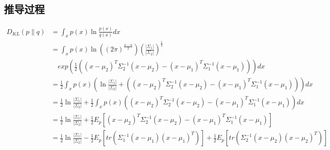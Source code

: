 \documentclass[UTF8,a4paper]{ctexart}
\begin{document}
  \subsection{推导过程}
\begin{small}
  \begin{align}
    D_{KL}\left( p\|q \right ) &= \int_x p(x)\ln \frac{ p(x) }{ q(x) } dx \label{eq1}\\
    &= \int_x p(x)
        \ln
          \left( (2\pi)^{\frac{n - n}{2}}   \right )
            \left( \frac{\left| \Sigma_1 \right|}{\left| \Sigma_2 \right|} \right )^\frac{1}{2}
            \\&\quad
            exp\left(
                \frac{1}{2}\left(
                  \left( x - \mu_2 \right)^T\Sigma_2^{-1}\left( x - \mu_2 \right) -
                  \left( x - \mu_1 \right)^T\Sigma_1^{-1}\left( x - \mu_1 \right)
                \right )
          \right )
        dx\label{eq2}\\
    &=  \frac{1}{2}
          \int_x p(x)
            \left(
              \ln \frac{\left| \Sigma_1 \right|}{\left| \Sigma_2 \right|} +
              \left(
                    \left( x - \mu_2 \right)^T\Sigma_2^{-1}\left( x - \mu_2 \right) -
                    \left( x - \mu_1 \right)^T\Sigma_1^{-1}\left( x - \mu_1 \right)
              \right )
            \right )
          dx\label{eq3}\\
    &=  \frac{1}{2} \ln \frac{\left| \Sigma_1 \right|}{\left| \Sigma_2 \right|} +
          \frac{1}{2}\int_x p(x)
                \left(
                \left( x - \mu_2 \right)^T\Sigma_2^{-1}\left( x - \mu_2 \right) -
                \left( x - \mu_1 \right)^T\Sigma_1^{-1}\left( x - \mu_1 \right)
                \right )
          dx\label{eq4}\\
    &=  \frac{1}{2} \ln \frac{\left| \Sigma_1 \right|}{\left| \Sigma_2 \right|} +
        \frac{1}{2} E_p
          \left[
            \left( x - \mu_2 \right)^T\Sigma_2^{-1}\left( x - \mu_2 \right) -
            \left( x - \mu_1 \right)^T\Sigma_1^{-1}\left( x - \mu_1 \right)
          \right]\label{eq5} \\
    &=  \frac{1}{2} \ln \frac{\left| \Sigma_1 \right|}{\left| \Sigma_2 \right|}
        -
        \frac{1}{2} E_p
          \left[
              tr\left( \Sigma_1^{-1}\left( x - \mu_1 \right)\left( x - \mu_1 \right)^T \right)
          \right]
        +
        \frac{1}{2} E_p
          \left[
              tr\left( \Sigma_2^{-1}\left( x - \mu_2 \right)\left( x - \mu_2 \right)^T \right)
          \right]\label{eq6}\\

\end{align}
\end{small}
\end{document}
